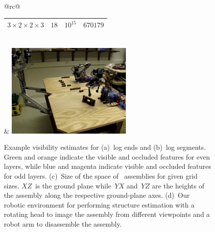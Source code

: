 \begin{figure}
\begin{tabular}{@{}rc@{}}
\begin{tabular}[b]{@{}c@{\hspace{10pt}}r@{\hspace{10pt}}r@{\hspace{10pt}}r@{}}
      $3 \times 2 \times 2 \times 3$ &          $18$ &         $10^{15}$ & $670179$\\
      \bottomrule
    \end{tabular}\\
     & \includegraphics[width=0.55\textwidth]{images/robots}
  \end{tabular}
  \par\vspace*{-2ex}
  \caption{Example visibility estimates for (a)~log ends and (b)~log segments.
    Green and orange indicate the visible and occluded features for
    even layers, while blue and magenta indicate visible and occluded features
    for odd layers.
    (c)~Size of the space of \LincolnLog\ assemblies for given grid
    sizes.
    $XZ$~is the ground plane while~$YX$ and~$YZ$ are the heights of the
    assembly along the respective ground-plane axes.
    (d)~Our robotic environment for performing structure estimation
    with a rotating head to image the assembly from different viewpoints and a
    robot arm to disassemble the assembly.}
  \label{fig:complexity}
  \par\vspace*{-5ex}
\end{figure}

